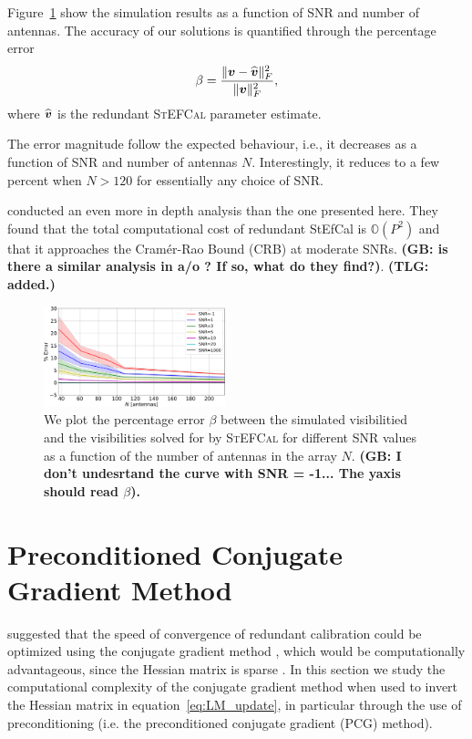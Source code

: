 \documentclass[useAMS,usenatbib]{mn2e}
\newcommand{\bv}{\bmath{v}}
\begin{document}
Figure~\ref{fig:prec_error} show the simulation results as a function of SNR and number of antennas. The accuracy of our solutions is quantified through the percentage error
\begin{equation}
\label{eq:beta}
\beta = \frac{\|\bv - \widehat{\bv}\|_F^2}{\|\bv\|_F^2},
\end{equation}
where $\widehat{\bv}$ is the redundant \textsc{StEFCal} parameter estimate.

The error magnitude follow the expected behaviour, i.e., it decreases as a function of SNR and number of antennas $N$. Interestingly, it reduces to a few percent when $N > 120$ for essentially any choice of SNR. 

\citet{Marthi2014} conducted an even more in depth analysis than the one presented here. They found that the total computational cost of redundant StEfCal
is $\mathbb{O}(P^2)$ and that it approaches the Cram{\'e}r-Rao Bound (CRB) at moderate SNRs. 
{\bf (GB: is there a similar analysis in \cite{Liu2010} a/o \cite{Marthi2014}? If so, what do they find?)}.
{\bf (TLG: added.)}

\begin{figure}
\includegraphics[width=0.47\textwidth]{./prec_error.pdf} 
\caption{We plot the percentage error $\beta$ between the simulated visibilitied and the visibilities solved for by \textsc{StEFCal} for different SNR values as a function of the number of antennas in the array $N$. {\bf (GB: I don't undesrtand the curve with SNR = -1... The yaxis should read $\beta$).}}
\label{fig:prec_error}
\end{figure}


\section{Preconditioned Conjugate Gradient Method}
\label{sec:pcg}
\citet{Liu2010} suggested that the speed of convergence of redundant calibration could be optimized using the 
conjugate gradient method \citep{Hestenes1952}, which would be computationally advantageous, since the Hessian matrix 
is sparse \citep{Reid1971}. In this section we study the computational complexity
of the conjugate gradient method when used to invert the Hessian matrix in equation~\ref{eq:LM_update}, 
in particular through the use of preconditioning (i.e. the preconditioned conjugate gradient (PCG) method). 
\end{document}
